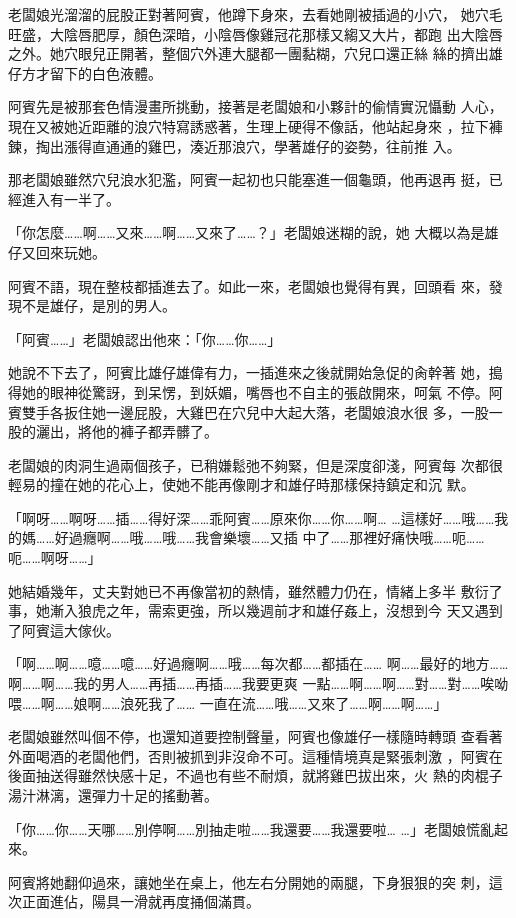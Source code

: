 老闆娘光溜溜的屁股正對著阿賓，他蹲下身來，去看她剛被插過的小穴，
她穴毛旺盛，大陰唇肥厚，顏色深暗，小陰唇像雞冠花那樣又縐又大片，都跑
出大陰唇之外。她穴眼兒正開著，整個穴外連大腿都一團黏糊，穴兒口還正絲
絲的擠出雄仔方才留下的白色液體。

阿賓先是被那套色情漫畫所挑動，接著是老闆娘和小夥計的偷情實況懾動
人心，現在又被她近距離的浪穴特寫誘惑著，生理上硬得不像話，他站起身來
，拉下褲鍊，掏出漲得直通通的雞巴，湊近那浪穴，學著雄仔的姿勢，往前推
入。

那老闆娘雖然穴兒浪水犯濫，阿賓一起初也只能塞進一個龜頭，他再退再
挺，已經進入有一半了。

「你怎麼……啊……又來……啊……又來了……？」老闆娘迷糊的說，她
大概以為是雄仔又回來玩她。

阿賓不語，現在整枝都插進去了。如此一來，老闆娘也覺得有異，回頭看
來，發現不是雄仔，是別的男人。

「阿賓……」老闆娘認出他來：「你……你……」

她說不下去了，阿賓比雄仔雄偉有力，一插進來之後就開始急促的肏幹著
她，搗得她的眼神從驚訝，到呆愣，到妖媚，嘴唇也不自主的張啟開來，呵氣
不停。阿賓雙手各扳住她一邊屁股，大雞巴在穴兒中大起大落，老闆娘浪水很
多，一股一股的灑出，將他的褲子都弄髒了。

老闆娘的肉洞生過兩個孩子，已稍嫌鬆弛不夠緊，但是深度卻淺，阿賓每
次都很輕易的撞在她的花心上，使她不能再像剛才和雄仔時那樣保持鎮定和沉
默。

「啊呀……啊呀……插……得好深……乖阿賓……原來你……你……啊…
…這樣好……哦……我的媽……好過癮啊……哦……哦……我會樂壞……又插
中了……那裡好痛快哦……呃……呃……啊呀……」

她結婚幾年，丈夫對她已不再像當初的熱情，雖然體力仍在，情緒上多半
敷衍了事，她漸入狼虎之年，需索更強，所以幾週前才和雄仔姦上，沒想到今
天又遇到了阿賓這大傢伙。

「啊……啊……噫……噫……好過癮啊……哦……每次都……都插在……
啊……最好的地方……啊……啊……我的男人……再插……再插……我要更爽
一點……啊……啊……對……對……唉呦喂……啊……娘啊……浪死我了……
一直在流……哦……又來了……啊……啊……」

老闆娘雖然叫個不停，也還知道要控制聲量，阿賓也像雄仔一樣隨時轉頭
查看著外面喝酒的老闆他們，否則被抓到非沒命不可。這種情境真是緊張刺激
，阿賓在後面抽送得雖然快感十足，不過也有些不耐煩，就將雞巴拔出來，火
熱的肉棍子湯汁淋漓，還彈力十足的搖動著。

「你……你……天哪……別停啊……別抽走啦……我還要……我還要啦…
…」老闆娘慌亂起來。

阿賓將她翻仰過來，讓她坐在桌上，他左右分開她的兩腿，下身狠狠的突
刺，這次正面進佔，陽具一滑就再度捅個滿貫。

